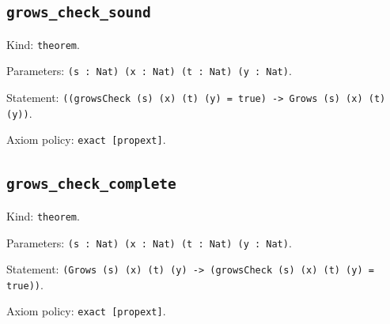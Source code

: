 \documentclass[11pt]{article}
\begin{document}
\subsection*{\texttt{grows\_check\_sound}}
\noindent Kind: \texttt{theorem}.\par
\noindent Parameters: \texttt{(s : Nat) (x : Nat) (t : Nat) (y : Nat)}.\par
\noindent Statement: \texttt{((growsCheck (s) (x) (t) (y) = true) -> Grows (s) (x) (t) (y))}.\par
\noindent Axiom policy: \texttt{exact [propext]}.\par
\subsection*{\texttt{grows\_check\_complete}}
\noindent Kind: \texttt{theorem}.\par
\noindent Parameters: \texttt{(s : Nat) (x : Nat) (t : Nat) (y : Nat)}.\par
\noindent Statement: \texttt{(Grows (s) (x) (t) (y) -> (growsCheck (s) (x) (t) (y) = true))}.\par
\noindent Axiom policy: \texttt{exact [propext]}.\par
\end{document}
